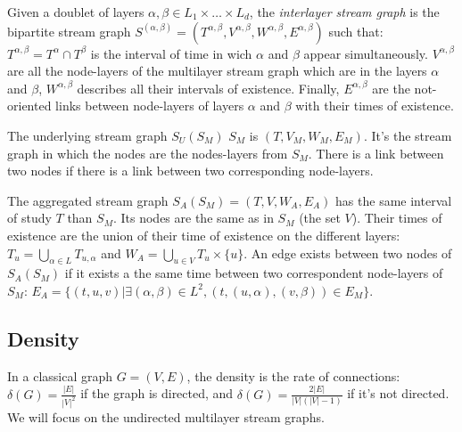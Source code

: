 \documentclass{svproc}
\begin{document}
	
	\begin{definition}		
	Given a doublet of layers $\alpha, \beta \in L_1\times \dots\times L_d$, the {\em interlayer stream graph} is the bipartite stream graph $S^{(\alpha,\beta)} = (T^{\alpha,\beta}, V^{\alpha,\beta},W^{\alpha,\beta},E^{\alpha,\beta})$ such that: $T^{\alpha,\beta}=T^{\alpha}\cap T^{\beta}$ is the interval of time in wich $\alpha$ and $\beta$ appear simultaneously. $V^{\alpha,\beta}$ are all the node-layers of the multilayer stream graph which are in the layers $\alpha$ and $\beta$, $W^{\alpha,\beta}$ describes all their intervals of existence. Finally, $E^{\alpha,\beta}$ are the not-oriented links between node-layers of layers $\alpha$ and $\beta$ with their times of existence.
	\end{definition}
	
\begin{definition}
	The underlying stream graph $S_U(S_M)$ $S_M$ is  $(T,V_M,W_M,E_M)$. It's the stream graph in which the nodes are the nodes-layers from $S_M$. There is a link between two nodes if there is a link between two corresponding node-layers.
\end{definition}
	
	\begin{definition}
		
		The aggregated stream graph $S_A(S_M)=(T,V,W_A,E_A)$ has the same interval of study $T$ than $S_M$. Its nodes are the same as in $S_M$ (the set $V$). Their times of existence are the union of their time of existence on the different layers: $T_u = \bigcup_{\alpha \in L} T_{u,\alpha}$ and $W_A=\bigcup_{u\in V} T_u\times\{u\}$. An edge exists between two nodes of $S_A(S_M)$ if it exists a the same time between two correspondent node-layers of $S_M$:  $E_A = \{(t,u,v)| \exists (\alpha,\beta) \in L^2, (t,(u,\alpha),(v,\beta)) \in E_M \}$.
	\end{definition}

\subsection{Density}
%
In a classical graph $G=(V,E)$, the density is the rate of connections: $\delta(G)= \frac{|E|}{|V|^2}$ if the graph is directed, and  $\delta(G)= \frac{2|E|}{|V|(|V|-1)}$ if it's not directed. We will focus on the undirected multilayer stream graphs.
\end{document}
